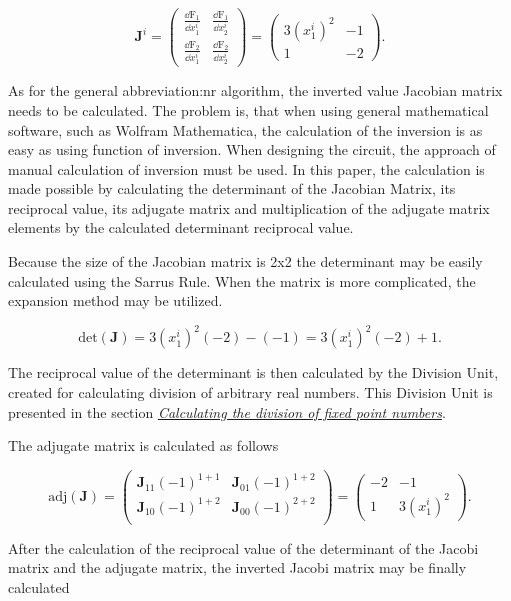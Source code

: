 \documentclass[a4paper, twoside, 11pt]{article}
\begin{document}
    \begin{equation}
        \textbf{J}^i = 
        \begin{pmatrix}
            \frac{\dd \text{F}_1}{\dd x_1^i} & \frac{\dd \text{F}_1}{\dd x_2^i}\\
            \frac{\dd \text{F}_2}{\dd x_1^i} & \frac{\dd \text{F}_2}{\dd x_2^i}
        \end{pmatrix}
        =
        \begin{pmatrix}
            3 (x_1^i)^2 & -1\\
            1 & -2
        \end{pmatrix}.
    \end{equation}

    As for the general \gls{abbreviation:nr} algorithm, the inverted value Jacobian matrix needs to be calculated. The problem is, that when using general mathematical software, such as Wolfram Mathematica, the calculation of the inversion is as easy as using function of inversion. When designing the circuit, the approach of manual calculation of inversion must be used. In this paper, the calculation is made possible by calculating the determinant of the Jacobian Matrix, its reciprocal value, its adjugate matrix and multiplication of the adjugate matrix elements by the calculated determinant reciprocal value.\par
    Because the size of the Jacobian matrix is 2x2 the determinant may be easily calculated using the Sarrus Rule. When the matrix is more complicated, the expansion method may be utilized.

    \begin{equation}
        \text{det}(\textbf{J}) = 3 (x_1^i)^2 (-2) - (-1) = 3 (x_1^i)^2 (-2) + 1.
    \end{equation}

    The reciprocal value of the determinant is then calculated by the Division Unit, created for calculating division of arbitrary real numbers. This Division Unit is presented in the section \hyperref[sec:calculating-the-division-of-fixed-point-numbers]{\textit{Calculating the division of fixed point numbers}}.\par
The adjugate matrix is calculated as follows

    \begin{equation}
        \text{adj}(\textbf{J}) =
        \begin{pmatrix}
            \textbf{J}_{11} (-1)^{1+1} & \textbf{J}_{01} (-1)^{1+2}\\

            \textbf{J}_{10} (-1)^{1+2} & \textbf{J}_{00} (-1)^{2+2}\\
        \end{pmatrix} =
        \begin{pmatrix}
            -2 & -1\\
            1 & 3 (x_1^i)^2
        \end{pmatrix}.
    \end{equation}
\par
    After the calculation of the reciprocal value of the determinant of the Jacobi matrix and the adjugate matrix, the inverted Jacobi matrix may be finally calculated
\end{document}
